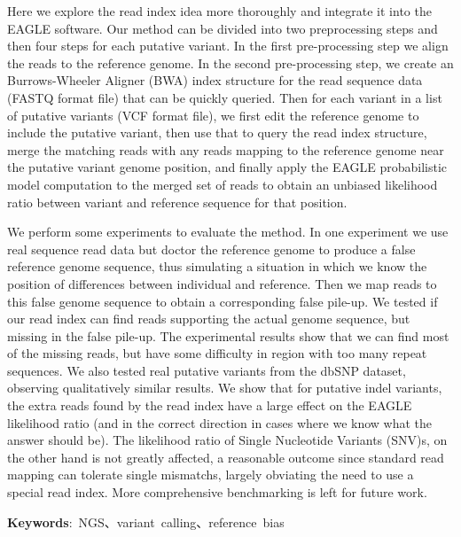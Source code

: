 Here we explore the read index idea more thoroughly and integrate it into the EAGLE software.
Our method can be divided into two preprocessing steps and then four steps for each putative variant.  In the first pre-processing step we align the reads to the reference genome.  In the second pre-processing step, we create an Burrows-Wheeler Aligner (BWA) index structure for the read sequence data (FASTQ format file) that can be quickly queried.  Then for each variant in a list of putative variants (VCF format file), we first edit the reference genome to include the putative variant, then use that to query the read index structure, merge the matching reads with any reads mapping to the reference genome near the putative variant genome position, and finally apply the EAGLE probabilistic model computation to the merged set of reads to obtain an unbiased likelihood ratio between variant and reference sequence for that position.

We perform some experiments to evaluate the method.  In one experiment we use real sequence read data but doctor the reference genome to produce a false reference genome sequence, thus simulating a situation in which we know the position of differences between individual and reference.  Then we map reads to this false genome sequence to obtain a corresponding false pile-up.   We tested if our read index can find reads supporting the actual genome sequence, but missing in the false pile-up.  The experimental results show that we can find most of the missing reads, but have some difficulty in region with too many repeat sequences.  We also tested real putative variants from the dbSNP dataset, observing qualitatively similar results.  We show that for putative indel variants, the extra reads found by the read index have a large effect on the EAGLE likelihood ratio (and in the correct direction in cases where we know what the answer should be).  The likelihood ratio of Single Nucleotide Variants (SNV)s, on the other hand is not greatly affected, a reasonable outcome since standard read mapping can tolerate single mismatchs, largely obviating the need to use a special read index.  More comprehensive benchmarking is left for future work.


\begin{flushleft}
\mbox{{\bf Keywords}:  NGS、variant calling、reference bias }
\end{flushleft}